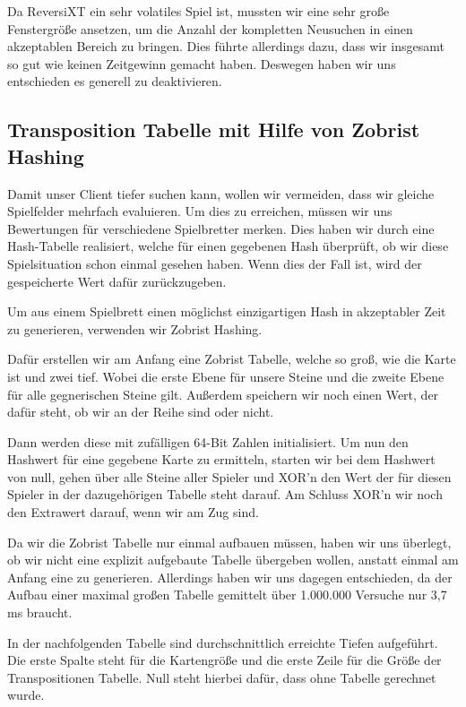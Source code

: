 \documentclass[12pt,a4paper,bibliography=totocnumbered,listof=totocnumbered]{article}
\begin{document}
Da ReversiXT ein sehr volatiles Spiel ist, mussten wir eine sehr große Fenstergröße ansetzen, um die Anzahl der kompletten Neusuchen in einen akzeptablen Bereich zu bringen. Dies führte allerdings dazu, dass wir insgesamt so gut wie keinen Zeitgewinn gemacht haben.
Deswegen haben wir uns entschieden es generell zu deaktivieren.

\subsection{Transposition Tabelle mit Hilfe von Zobrist Hashing}
Damit unser Client tiefer suchen kann, wollen wir vermeiden, dass wir gleiche Spielfelder mehrfach evaluieren. Um dies zu erreichen, müssen wir uns Bewertungen für verschiedene Spielbretter merken.
Dies haben wir durch eine Hash-Tabelle realisiert, welche für einen gegebenen Hash überprüft, ob wir diese Spielsituation schon einmal gesehen haben. Wenn dies der Fall ist, wird der gespeicherte Wert dafür zurückzugeben.

Um aus einem Spielbrett einen möglichst einzigartigen Hash in akzeptabler Zeit zu generieren, verwenden wir Zobrist Hashing.

Dafür erstellen wir am Anfang eine Zobrist Tabelle, welche so groß, wie die Karte ist und zwei tief. Wobei die erste Ebene für unsere Steine und die zweite Ebene für alle gegnerischen Steine gilt. Außerdem speichern wir noch einen Wert, der dafür steht, ob wir an der Reihe sind oder nicht.

Dann werden diese mit zufälligen 64-Bit Zahlen initialisiert.
Um nun den Hashwert für eine gegebene Karte zu ermitteln, starten wir bei dem Hashwert von null, gehen über alle Steine aller Spieler und XOR'n den Wert der für diesen Spieler in der dazugehörigen Tabelle steht darauf. Am Schluss XOR'n wir noch den Extrawert darauf, wenn wir am Zug sind.

Da wir die Zobrist Tabelle nur einmal aufbauen müssen, haben wir uns überlegt, ob wir nicht eine explizit aufgebaute Tabelle übergeben wollen, anstatt einmal am Anfang eine zu generieren.
Allerdings haben wir uns dagegen entschieden, da der Aufbau einer maximal großen Tabelle gemittelt über 1.000.000 Versuche nur 3,7 ms braucht.

In der nachfolgenden Tabelle sind durchschnittlich erreichte Tiefen aufgeführt. Die erste Spalte steht für die Kartengröße und die erste Zeile für die Größe der Transpositionen Tabelle. Null steht hierbei dafür, dass ohne Tabelle gerechnet wurde.
\end{document}

